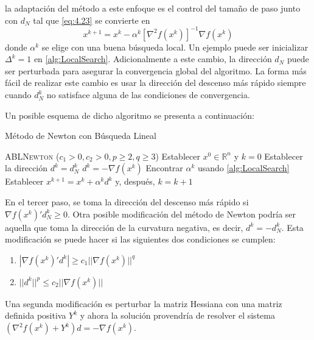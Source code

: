 la adaptación del método a este enfoque es el control del tamaño de paso junto con $d_N$ tal que \ref{eq:4.23} se convierte en
\begin{equation}
x^{k+1} = x^k - \alpha^k[\nabla^2 f(x^k)]^{-1}\nabla f(x^k)
\label{eq:4.24}
\end{equation}
donde $\alpha^k$ se elige con una buena búsqueda local. 
Un ejemplo puede ser inicializar $\Delta^k = 1$ en \ref{alg:LocalSearch}. 
Adicionalmente a este cambio, la dirección $d_N$ puede ser perturbada para asegurar la convergencia global del algoritmo. 
La forma más fácil de realizar este cambio es usar la dirección del descenso más rápido siempre cuando $d^k_N$ no satisface alguna de las condiciones de convergencia. 

Un posible esquema de dicho algoritmo se presenta a continuación:

\begin{algorithm}[H]
\caption{Método de Newton con Búsqueda Lineal}\label{alg:LSNewton}
\begin{algorithmic}[1]
\Procedure \textsc{ABLNewton} ($c_1>0,c_2>0,p\geq 2, q\geq 3$)
\State Establecer $x^0\in\mathbb{R}^n$ y $k=0$
		\State Establecer la dirección $d^k = d_N^k$
	\Else
		\State $d^k = -\nabla f(x^k)$
	\EndIf
	\State Encontrar $\alpha^k$ usando \ref{alg:LocalSearch}
	\State Establecer $x^{k+1} = x^k+\alpha^kd^k$ y, después, $k=k+1$
\EndWhile
\EndProcedure
\end{algorithmic}
\end{algorithm}

En el tercer paso, se toma la dirección del descenso más rápido si $\nabla f(x^k)'d^k_N\geq 0$. 
Otra posible modificación del método de Newton podría ser aquella que toma la dirección de la curvatura negativa, es decir, $d^k = -d_N^k$. 
Esta modificación se puede hacer si las siguientes dos condiciones se cumplen:
\begin{enumerate}
	\item $|\nabla f(x^k)'d^k| \geq c_1||\nabla f(x^k)||^q$
	\item $||d^k||^p \leq c_2 ||\nabla f(x^k)||$
\end{enumerate}

Una segunda modificación es perturbar la matriz Hessiana con una matriz definida positiva $Y^k$ y ahora la solución provendría de resolver el sistema $(\nabla^2 f(x^k) + Y^k)d = -\nabla f(x^k)$.

